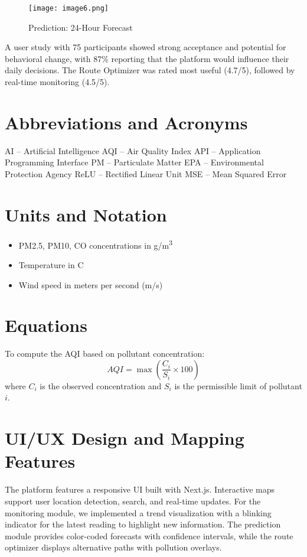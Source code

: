 \documentclass[conference]{IEEEtran}
\begin{document}
\begin{figure}[htbp]
    \centering
    \texttt{[image: image6.png]}
    \caption{Prediction: 24-Hour Forecast}
    \label{fig:forecast}
\end{figure}

A user study with 75 participants showed strong acceptance and potential for behavioral change, with 87\% reporting that the platform would influence their daily decisions. The Route Optimizer was rated most useful (4.7/5), followed by real-time monitoring (4.5/5).

\section{Abbreviations and Acronyms}
AI – Artificial Intelligence\newline
AQI – Air Quality Index\newline
API – Application Programming Interface\newline
PM – Particulate Matter\newline
EPA – Environmental Protection Agency\newline
ReLU – Rectified Linear Unit\newline
MSE – Mean Squared Error

\section{Units and Notation}
\begin{itemize}
    \item PM2.5, PM10, CO concentrations in \textmu g/m\textsuperscript{3}
    \item Temperature in \textdegree C
    \item Wind speed in meters per second (m/s)
\end{itemize}

\section{Equations}
To compute the AQI based on pollutant concentration:
\begin{equation}
AQI = \max\left( \frac{C_i}{S_i} \times 100 \right)\label{eq:aqi}
\end{equation}
where $C_i$ is the observed concentration and $S_i$ is the permissible limit of pollutant $i$.

\section{UI/UX Design and Mapping Features}
The platform features a responsive UI built with Next.js. Interactive maps support user location detection, search, and real-time updates. For the monitoring module, we implemented a trend visualization with a blinking indicator for the latest reading to highlight new information. The prediction module provides color-coded forecasts with confidence intervals, while the route optimizer displays alternative paths with pollution overlays.
\end{document}
